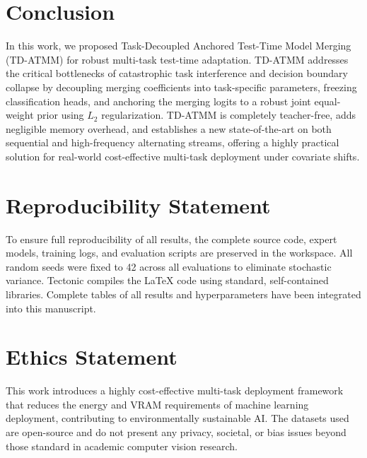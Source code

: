 \documentclass{article}
\theoremstyle{plain}
\theoremstyle{definition}
\theoremstyle{remark}
\begin{document}
\section{Conclusion}
In this work, we proposed Task-Decoupled Anchored Test-Time Model Merging (TD-ATMM) for robust multi-task test-time adaptation. TD-ATMM addresses the critical bottlenecks of catastrophic task interference and decision boundary collapse by decoupling merging coefficients into task-specific parameters, freezing classification heads, and anchoring the merging logits to a robust joint equal-weight prior using $L_2$ regularization. TD-ATMM is completely teacher-free, adds negligible memory overhead, and establishes a new state-of-the-art on both sequential and high-frequency alternating streams, offering a highly practical solution for real-world cost-effective multi-task deployment under covariate shifts.

\section*{Reproducibility Statement}
To ensure full reproducibility of all results, the complete source code, expert models, training logs, and evaluation scripts are preserved in the workspace. All random seeds were fixed to 42 across all evaluations to eliminate stochastic variance. Tectonic compiles the LaTeX code using standard, self-contained libraries. Complete tables of all results and hyperparameters have been integrated into this manuscript.

\section*{Ethics Statement}
This work introduces a highly cost-effective multi-task deployment framework that reduces the energy and VRAM requirements of machine learning deployment, contributing to environmentally sustainable AI. The datasets used are open-source and do not present any privacy, societal, or bias issues beyond those standard in academic computer vision research.

\clearpage


\end{document}
